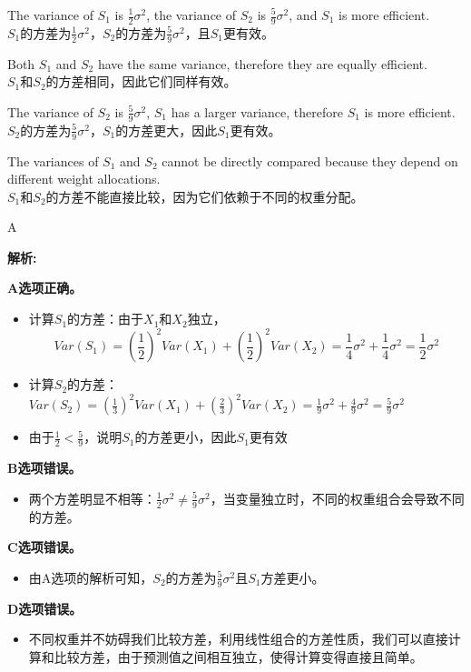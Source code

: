 \documentclass{article}
\newenvironment{explanation}
{\textbf{解析:}\par}
{\par}
\begin{document}
\begin{choices}
    \item The variance of \(S_1\) is \(\frac{1}{2}\sigma^2\), the variance of \(S_2\) is \(\frac{5}{9}\sigma^2\), and \(S_1\) is more efficient.\\
    \(S_1\)的方差为\(\frac{1}{2}\sigma^2\)，\(S_2\)的方差为\(\frac{5}{9}\sigma^2\)，且\(S_1\)更有效。
    \item Both \(S_1\) and \(S_2\) have the same variance, therefore they are equally efficient.\\
    \(S_1\)和\(S_2\)的方差相同，因此它们同样有效。
    \item The variance of \(S_2\) is \(\frac{5}{9}\sigma^2\), \(S_1\) has a larger variance, therefore \(S_1\) is more efficient.\\
    \(S_2\)的方差为\(\frac{5}{9}\sigma^2\)，\(S_1\)的方差更大，因此\(S_1\)更有效。
    \item The variances of \(S_1\) and \(S_2\) cannot be directly compared because they depend on different weight allocations.\\
    \(S_1\)和\(S_2\)的方差不能直接比较，因为它们依赖于不同的权重分配。
\end{choices}

\begin{correctanswer}
    A
\end{correctanswer}
\begin{explanation}
\textbf{A选项正确。}
\begin{itemize}
    \item 计算\(S_1\)的方差：由于\(X_1\)和\(X_2\)独立，\[Var(S_1)=(\frac{1}{2})^2Var(X_1)+(\frac{1}{2})^2Var(X_2)=\frac{1}{4}\sigma^2+\frac{1}{4}\sigma^2=\frac{1}{2}\sigma^2\]
    \item 计算\(S_2\)的方差：\(Var(S_2)=(\frac{1}{3})^2Var(X_1)+(\frac{2}{3})^2Var(X_2)=\frac{1}{9}\sigma^2+\frac{4}{9}\sigma^2=\frac{5}{9}\sigma^2\)
    \item 由于\(\frac{1}{2} < \frac{5}{9}\)，说明\(S_1\)的方差更小，因此\(S_1\)更有效
\end{itemize}

\textbf{B选项错误。}
\begin{itemize}
    \item 两个方差明显不相等：\(\frac{1}{2}\sigma^2 \neq \frac{5}{9}\sigma^2\)，当变量独立时，不同的权重组合会导致不同的方差。
\end{itemize}

\textbf{C选项错误。}
\begin{itemize}
    \item 由A选项的解析可知，\(S_2\)的方差为\(\frac{5}{9}\sigma^2\)且\(S_1\)方差更小。
\end{itemize}

\textbf{D选项错误。}
\begin{itemize}
    \item 不同权重并不妨碍我们比较方差，利用线性组合的方差性质，我们可以直接计算和比较方差，由于预测值之间相互独立，使得计算变得直接且简单。
\end{itemize}
\end{explanation}
\end{document}
